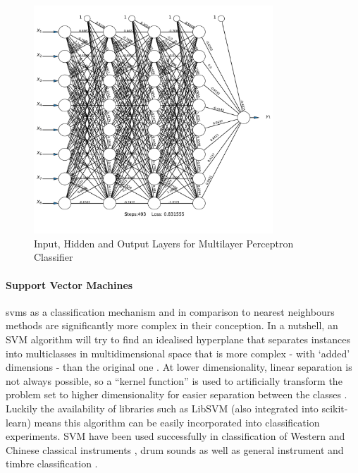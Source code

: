 {{{{\begin{figure}
	\begin{center}
		\includegraphics[width=0.8\textwidth]{ch05_pyconcat/figures/neural_network.pdf}
	\end{center}
	\caption[Input, Hidden and Output Layers for Multilayer Perceptron Classifier]{Input, Hidden and Output Layers for Multilayer Perceptron Classifier}
	\label{fig:neural_net}
\end{figure}

\paragraph{Support Vector Machines} 

\acrfull{svm}s as a classification mechanism and in comparison to nearest neighbours methods are significantly more complex in their conception. In a nutshell, an SVM algorithm will try to find an idealised hyperplane that separates instances into multiclasses in multidimensional space that is more complex - with `added' dimensions - than the original one \citep{Chang2008}. At lower dimensionality, linear separation is not always possible, so a ``kernel function'' is used to artificially transform the problem set to higher dimensionality for easier separation between the classes \citep{Xu2003}. Luckily the availability of libraries such as LibSVM \citep{Chang2011} (also integrated into scikit-learn) means this algorithm can be easily incorporated into classification experiments. SVM have been used successfully in classification of Western and Chinese classical instruments \citep{Liu2010a}, drum sounds \citep{Herrera2002, Herrera2003} as well as general instrument and timbre classification \citep{Herrera-Boyer2003, Krey2010, Agostini2003, Deng2008}.

}}}}
